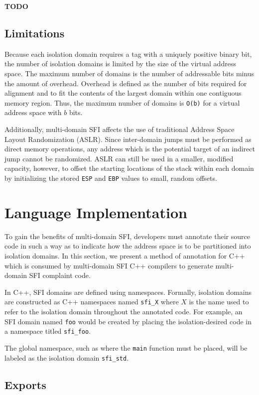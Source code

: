\documentclass[12pt]{article}
\begin{document}
\textbf{TODO}

\subsection{Limitations}

Because each isolation domain requires a tag with a uniquely positive binary bit, the number of isolation domains is limited by the size of the virtual address space. The maximum number of domains is the number of addressable bits minus the amount of overhead. Overhead is defined as the number of bits required for alignment and to fit the contents of the largest domain within one contiguous memory region. Thus, the maximum number of domains is \texttt{O(b)} for a virtual address space with $b$ bits.

Additionally, multi-domain SFI affects the use of traditional Address Space Layout Randomization (ASLR). Since inter-domain jumps must be performed as direct memory operations, any address which is the potential target of an indirect jump cannot be randomized. ASLR can still be used in a smaller, modified capacity, however, to offset the starting locations of the stack within each domain by initializing the stored \texttt{ESP} and \texttt{EBP} values to small, random offsets.

\section{Language Implementation}

To gain the benefits of multi-domain SFI, developers must annotate their source code in such a way as to indicate how the address space is to be partitioned into isolation domains. In this section, we present a method of annotation for C++ which is consumed by multi-domain SFI C++ compilers to generate multi-domain SFI complaint code.

In C++, SFI domains are defined using namespaces. Formally, isolation domains are constructed as C++ namespaces named \texttt{sfi\_X} where $X$ is the name used to refer to the isolation domain throughout the annotated code. For example, an SFI domain named \texttt{foo} would be created by placing the isolation-desired code in a namespace titled \texttt{sfi\_foo}.

The global namespace, such as where the \texttt{main} function must be placed, will be labeled as the isolation domain \texttt{sfi\_std}.

\subsection{Exports} \label{exports}
\end{document}
